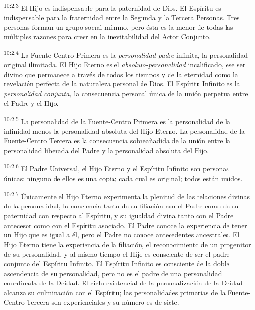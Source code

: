 \par
\textsuperscript{10:2.3} El Hijo es indispensable para la paternidad de Dios. El Espíritu es indispensable para la fraternidad entre la Segunda y la Tercera Personas. Tres personas forman un grupo social mínimo, pero ésta es la menor de todas las múltiples razones para creer en la inevitabilidad del Actor Conjunto.

\par
\textsuperscript{10:2.4} La Fuente-Centro Primera es la \textit{personalidad-padre} infinita, la personalidad original ilimitada. El Hijo Eterno es el \textit{absoluto-personalidad} incalificado, ese ser divino que permanece a través de todos los tiempos y de la eternidad como la revelación perfecta de la naturaleza personal de Dios. El Espíritu Infinito es la \textit{personalidad conjunta,} la consecuencia personal única de la unión perpetua entre el Padre y el Hijo.

\par
\textsuperscript{10:2.5} La personalidad de la Fuente-Centro Primera es la personalidad de la infinidad menos la personalidad absoluta del Hijo Eterno. La personalidad de la Fuente-Centro Tercera es la consecuencia sobreañadida de la unión entre la personalidad liberada del Padre y la personalidad absoluta del Hijo.

\par
\textsuperscript{10:2.6} El Padre Universal, el Hijo Eterno y el Espíritu Infinito son personas únicas; ninguno de ellos es una copia; cada cual es original; todos están unidos.

\par
\textsuperscript{10:2.7} Únicamente el Hijo Eterno experimenta la plenitud de las relaciones divinas de la personalidad, la conciencia tanto de su filiación con el Padre como de su paternidad con respecto al Espíritu, y su igualdad divina tanto con el Padre antecesor como con el Espíritu asociado. El Padre conoce la experiencia de tener un Hijo que es igual a él, pero el Padre no conoce antecedentes ancestrales. El Hijo Eterno tiene la experiencia de la filiación, el reconocimiento de un progenitor de su personalidad, y al mismo tiempo el Hijo es consciente de ser el padre conjunto del Espíritu Infinito. El Espíritu Infinito es consciente de la doble ascendencia de su personalidad, pero no es el padre de una personalidad coordinada de la Deidad. El ciclo existencial de la personalización de la Deidad alcanza su culminación con el Espíritu; las personalidades primarias de la Fuente-Centro Tercera son experienciales y su número es de siete.

